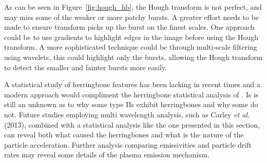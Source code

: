 As can be seen in Figure~\ref{fig:hough_hb}, the Hough transform is not perfect, and may miss some of the weaker or more patchy bursts. A greater effort needs to be made to ensure transform picks up the burst on the finest scales. One approach could be to use gradients to highlight edges in the image before using the Hough transform. A more sophisticated technique could be through multi-scale filtering using wavelets, this could highlight only the bursts, allowing the Hough transform to detect the smaller and fainter bursts more easily.

A statistical study of herringbone features has been lacking in recent times and a modern approach would compliment the herringbone statistical analysis of \citet{cairns1987, mann1995}. Is is still an unknown as to why some type IIs exhibit herringbones and why some do not. Future studies employing multi wavelength analysis, such as Carley {\it et al.}\,(2013), combined with a statistical analysis like the one presented in this section, can reveal both what caused the herringbones and what is the nature of the particle acceleration. Further analysis comparing emissivities and particle drift rates may reveal some details of the plasma emission mechanism.



